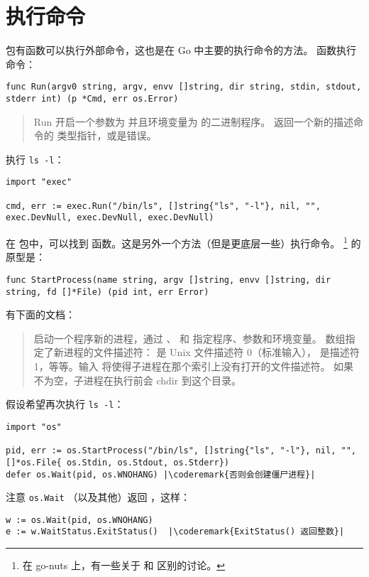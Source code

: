 \section{执行命令}
 包有函数可以执行外部命令，这也是在 Go 中主要的执行命令的方法。
 函数执行命令：
\begin{lstlisting}
func Run(argv0 string, argv, envv []string, dir string, stdin, stdout, stderr int) (p *Cmd, err os.Error)
\end{lstlisting}
\begin{quote}
Run 开启一个参数为  并且环境变量为  的二进制程序。
返回一个新的描述命令的  类型指针，或是错误。
\end{quote}
执行 \verb|ls -l|：
\begin{lstlisting}
import "exec"

cmd, err := exec.Run("/bin/ls", []string{"ls", "-l"}, nil, "", exec.DevNull, exec.DevNull, exec.DevNull)
\end{lstlisting}
在  包中，可以找到  函数。这是另外一个方法（但是更底层一些）执行命令。
\footnote{在 go-nuts 上，有一些关于  和  区别的讨论。} 
 的原型是：
\begin{lstlisting}
func StartProcess(name string, argv []string, envv []string, dir string, fd []*File) (pid int, err Error)
\end{lstlisting}
有下面的文档：
\begin{quote}
 启动一个程序新的进程，通过 、 和  指定程序、参数和环境变量。
 数组指定了新进程的文件描述符： 是 Unix 文件描述符 0（标准输入），
 是描述符 1，等等。输入  将使得子进程在那个索引上没有打开的文件描述符。
如果  不为空，子进程在执行前会 chdir 到这个目录。
\end{quote}
假设希望再次执行 \verb|ls -l|：
\begin{lstlisting}
import "os"

pid, err := os.StartProcess("/bin/ls", []string{"ls", "-l"}, nil, "", []*os.File{ os.Stdin, os.Stdout, os.Stderr})
defer os.Wait(pid, os.WNOHANG) |\coderemark{否则会创建僵尸进程}|
\end{lstlisting}
注意 \lstinline{os.Wait} （以及其他）返回 ，这样：
\begin{lstlisting}
w := os.Wait(pid, os.WNOHANG)
e := w.WaitStatus.ExitStatus()  |\coderemark{ExitStatus() 返回整数}|
\end{lstlisting}

